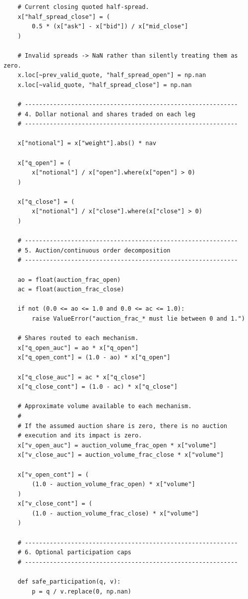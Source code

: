 \begin{verbatim}
    # Current closing quoted half-spread.
    x["half_spread_close"] = (
        0.5 * (x["ask"] - x["bid"]) / x["mid_close"]
    )

    # Invalid spreads -> NaN rather than silently treating them as zero.
    x.loc[~prev_valid_quote, "half_spread_open"] = np.nan
    x.loc[~valid_quote, "half_spread_close"] = np.nan

    # ------------------------------------------------------------
    # 4. Dollar notional and shares traded on each leg
    # ------------------------------------------------------------

    x["notional"] = x["weight"].abs() * nav

    x["q_open"] = (
        x["notional"] / x["open"].where(x["open"] > 0)
    )

    x["q_close"] = (
        x["notional"] / x["close"].where(x["close"] > 0)
    )

    # ------------------------------------------------------------
    # 5. Auction/continuous order decomposition
    # ------------------------------------------------------------

    ao = float(auction_frac_open)
    ac = float(auction_frac_close)

    if not (0.0 <= ao <= 1.0 and 0.0 <= ac <= 1.0):
        raise ValueError("auction_frac_* must lie between 0 and 1.")

    # Shares routed to each mechanism.
    x["q_open_auc"] = ao * x["q_open"]
    x["q_open_cont"] = (1.0 - ao) * x["q_open"]

    x["q_close_auc"] = ac * x["q_close"]
    x["q_close_cont"] = (1.0 - ac) * x["q_close"]

    # Approximate volume available to each mechanism.
    #
    # If the assumed auction share is zero, there is no auction
    # execution and its impact is zero.
    x["v_open_auc"] = auction_volume_frac_open * x["volume"]
    x["v_close_auc"] = auction_volume_frac_close * x["volume"]

    x["v_open_cont"] = (
        (1.0 - auction_volume_frac_open) * x["volume"]
    )
    x["v_close_cont"] = (
        (1.0 - auction_volume_frac_close) * x["volume"]
    )

    # ------------------------------------------------------------
    # 6. Optional participation caps
    # ------------------------------------------------------------

    def safe_participation(q, v):
        p = q / v.replace(0, np.nan)


\end{verbatim}
